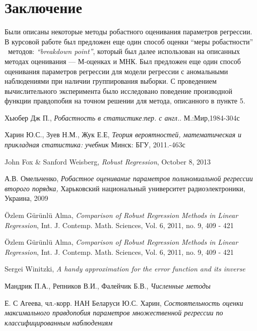 \documentclass[12pt]{article}
\begin{document}
\section{Заключение}
Были описаны некоторые методы робастного оценивания параметров регрессии.
В курсовой работе был предложен еще один способ оценки ``меры робастности'' ~методов: \textit{``breakdown point''}, который был далее использован на описанных методах оценивания --- М-оценках и МНК.
Был предложен еще один способ оценивания параметров регрессии для модели регрессии с аномальными наблюдениями при наличии группирования выборки. 
С проведением вычислительного эксперимента было исследовано поведение производной функции правдопобия на точном решении для метода, описанного в пункте 5.
\newpage
\begin{thebibliography}{9}
    Хьюбер Дж П.,
    \textit{Робастность в статистике:пер. с англ.}.
    М.:Мир,1984-304с

    Харин Ю.С., Зуев Н.М.,
    Жук Е.Е,
    \textit{Теория вероятностей, математическая и прикладная статистика: учебник}
    Минск: БГУ, 2011.-463с

    John Fox \& Sanford Weisberg,
    \textit{Robust Regression},
    October 8, 2013

    А.В. Омельченко,
    \textit{Робастное оценивание параметров полиномиальной регрессии второго порядка,}
    Харьковский национальный университет радиоэлектроники, Украина, 2009

    \"{O}zlem G\"{u}r\"{u}nl\"{u} Alma,
    \textit{Comparison of Robust Regression Methods
    in Linear Regression},
    Int. J. Contemp. Math. Sciences, Vol. 6, 2011, no. 9, 409 - 421

    \"{O}zlem G\"{u}r\"{u}nl\"{u} Alma,
    \textit{Comparison of Robust Regression Methods
    in Linear Regression},
    Int. J. Contemp. Math. Sciences, Vol. 6, 2011, no. 9, 409 - 421

    Sergei Winitzki,
    \textit{A handy approximation for the error function and its inverse}

    Мандрик П.А., Репников В.И., Фалейчик Б.В.,
    \textit{Численные методы}

    Е. С Агеева, чл.-корр. НАН Беларуси Ю.С. Харин,
    \textit{Состоятельность оценки максимального правдопобия параметров множественной регрессии по классифицированным наблюдениям}
\end{thebibliography}
\end{document}
